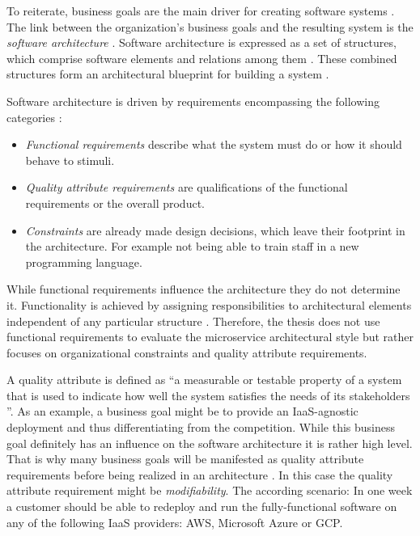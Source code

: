 To reiterate, business goals are the main driver for creating software systems \citep[p. 49]{Bass2012}.
The link between the organization's business goals and the resulting system is the \textit{software architecture} \citep[p. 3]{Bass2012}.
Software architecture is expressed as a set of structures, which comprise software elements and relations among them \citep[p. 4]{Bass2012}.
These combined structures form an architectural blueprint for building a system \citep[p. 4]{Bass2012}.

Software architecture is driven by requirements encompassing the following categories \citep[p. 64]{Bass2012}:
\begin{itemize}
\item \textit{Functional requirements} describe what the system must do or how it should behave to stimuli.
\item \textit{Quality attribute requirements} are qualifications of the functional requirements or the overall product.
\item \textit{Constraints} are already made design decisions, which leave their footprint in the architecture. For example not being able to train staff in a new programming language.
\end{itemize}

While functional requirements influence the architecture they do not determine it.
Functionality is achieved by assigning responsibilities to architectural elements independent of any particular structure \citep[p. 65]{Bass2012}.
Therefore, the thesis does not use functional requirements to evaluate the microservice architectural style but rather focuses on organizational constraints and quality attribute requirements.

A quality attribute is defined as ``a measurable or testable property of a system that is used to indicate how well the system satisfies the needs of its stakeholders \citep[p. 63]{Bass2012}''.
As an example, a business goal might be to provide an \ac{IaaS}-agnostic deployment and thus differentiating from the competition.
While this business goal definitely has an influence on the software architecture it is rather high level.
That is why many business goals will be manifested as quality attribute requirements before being realized in an architecture \citep[p. 49]{Bass2012}.
In this case the quality attribute requirement might be \textit{modifiability}.
The according scenario: In one week a customer should be able to redeploy and run the fully-functional software on any of the following \ac{IaaS} providers: \ac{AWS}, Microsoft Azure or \ac{GCP}.

